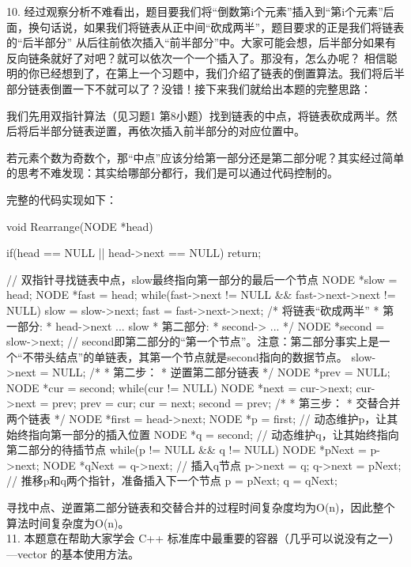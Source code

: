 10. 经过观察分析不难看出，题目要我们将“倒数第i个元素”插入到“第i个元素”后面，换句话说，如果我们将链表从正中间“砍成两半”，题目要求的正是我们将链表的“后半部分”
从后往前依次插入“前半部分”中。大家可能会想，后半部分如果有反向链条就好了对吧？就可以依次一个一个插入了。那没有，怎么办呢？
相信聪明的你已经想到了，在第上一个习题中，我们介绍了链表的倒置算法。我们将后半部分链表倒置一下不就可以了？没错！接下来我们就给出本题的完整思路：

我们先用双指针算法（见习题1 第8小题）找到链表的中点，将链表砍成两半。然后将后半部分链表逆置，再依次插入前半部分的对应位置中。

若元素个数为奇数个，那“中点”应该分给第一部分还是第二部分呢？其实经过简单的思考不难发现：其实给哪部分都行，我们是可以通过代码控制的。

完整的代码实现如下：
\begin{cppcode}

void Rearrange(NODE *head) {
    if(head == NULL || head->next == NULL)
        return;

    // 双指针寻找链表中点，slow最终指向第一部分的最后一个节点
    NODE *slow = head;
    NODE *fast = head;
    while(fast->next != NULL &&
          fast->next->next != NULL) {
        slow = slow->next;
        fast = fast->next->next;
    }
    /* 将链表“砍成两半”
     * 第一部分:
     * head->next ... slow
     * 第二部分:
     * second-> ...
     */
    NODE *second = slow->next;  // second即第二部分的“第一个节点”。注意：第二部分事实上是一个“不带头结点”的单链表，其第一个节点就是second指向的数据节点。
    slow->next = NULL;
    /*
     * 第二步：
     * 逆置第二部分链表
     */
    NODE *prev = NULL;
    NODE *cur = second;
    while(cur != NULL) {
        NODE *next = cur->next;
        cur->next = prev;
        prev = cur;
        cur = next;
    }
    second = prev;
    /*
     * 第三步：
     * 交替合并两个链表
     */
    NODE *first = head->next;
    NODE *p = first;    // 动态维护p，让其始终指向第一部分的插入位置
    NODE *q = second;   // 动态维护q，让其始终指向第二部分的待插节点
    while(p != NULL && q != NULL) {
        NODE *pNext = p->next;
        NODE *qNext = q->next;
        // 插入q节点
        p->next = q;
        q->next = pNext;
        // 推移p和q两个指针，准备插入下一个节点
        p = pNext;
        q = qNext;
    }
}
\end{cppcode}
寻找中点、逆置第二部分链表和交替合并的过程时间复杂度均为O(n)，因此整个算法时间复杂度为O(n)。\\

11. 本题意在帮助大家学会 C++ 标准库中最重要的容器（几乎可以说没有之一）---vector 的基本使用方法。

